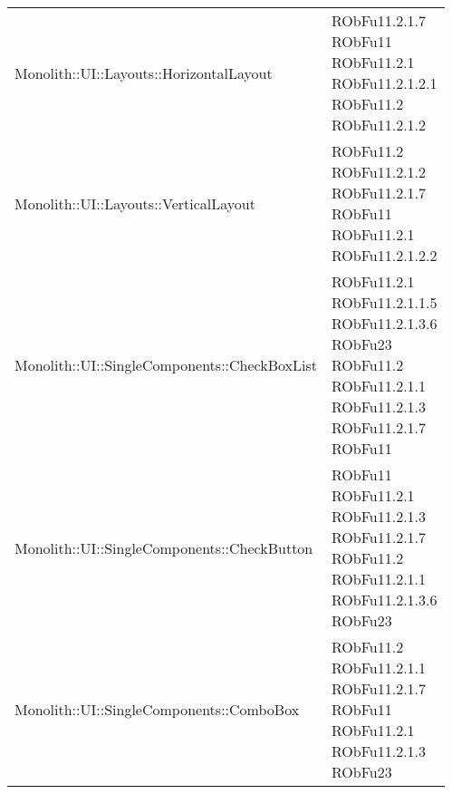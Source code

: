 \begin{center}
\begin{longtable}{|
*{1}{>{\centering\arraybackslash}m{7.5cm}|}
*{1}{>{\centering\arraybackslash}m{2.5cm}|}}
{\\RObFu11.2.1.7
\\RObFu11.2
\\}\\\hline
Monolith::UI::Layouts::HorizontalLayout & \makecell{RObFu11.2.1.7
\\RObFu11
\\RObFu11.2.1
\\RObFu11.2.1.2.1
\\RObFu11.2
\\RObFu11.2.1.2
\\}\\\hline
Monolith::UI::Layouts::VerticalLayout & \makecell{RObFu11.2
\\RObFu11.2.1.2
\\RObFu11.2.1.7
\\RObFu11
\\RObFu11.2.1
\\RObFu11.2.1.2.2
\\}\\\hline
Monolith::UI::SingleComponents::CheckBoxList & \makecell{RObFu11.2.1
\\RObFu11.2.1.1.5
\\RObFu11.2.1.3.6
\\RObFu23
\\RObFu11.2
\\RObFu11.2.1.1
\\RObFu11.2.1.3
\\RObFu11.2.1.7
\\RObFu11
\\}\\\hline
Monolith::UI::SingleComponents::CheckButton & \makecell{RObFu11
\\RObFu11.2.1
\\RObFu11.2.1.3
\\RObFu11.2.1.7
\\RObFu11.2
\\RObFu11.2.1.1
\\RObFu11.2.1.3.6
\\RObFu23
\\}\\\hline
Monolith::UI::SingleComponents::ComboBox & \makecell{RObFu11.2
\\RObFu11.2.1.1
\\RObFu11.2.1.7
\\RObFu11
\\RObFu11.2.1
\\RObFu11.2.1.3
\\RObFu23
\\}\\\hline

\end{longtable}
\end{center}

